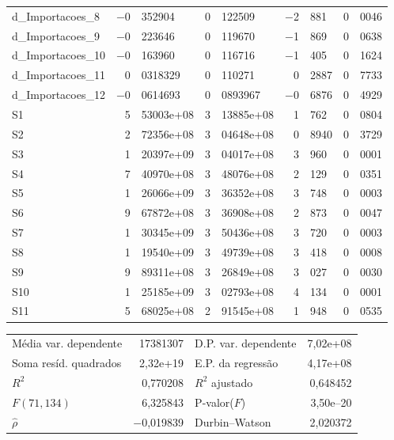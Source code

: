 \documentclass[11pt]{article}
\begin{document}
\begin{center}
\begin{tabular}{lr@{,}lr@{,}lr@{,}lr@{,}l}
d\_Importacoes\_8 &
  $-$0&352904 &
    0&122509 &
      $-$2&881 &
        0&0046 \\
d\_Importacoes\_9 &
  $-$0&223646 &
    0&119670 &
      $-$1&869 &
        0&0638 \\
d\_Importacoes\_10 &
  $-$0&163960 &
    0&116716 &
      $-$1&405 &
        0&1624 \\
d\_Importacoes\_11 &
  0&0318329 &
    0&110271 &
      0&2887 &
        0&7733 \\
d\_Importacoes\_12 &
  $-$0&0614693 &
    0&0893967 &
      $-$0&6876 &
        0&4929 \\
S1 &
  5&53003\textrm{e+08} &
    3&13885\textrm{e+08} &
      1&762 &
        0&0804 \\
S2 &
  2&72356\textrm{e+08} &
    3&04648\textrm{e+08} &
      0&8940 &
        0&3729 \\
S3 &
  1&20397\textrm{e+09} &
    3&04017\textrm{e+08} &
      3&960 &
        0&0001 \\
S4 &
  7&40970\textrm{e+08} &
    3&48076\textrm{e+08} &
      2&129 &
        0&0351 \\
S5 &
  1&26066\textrm{e+09} &
    3&36352\textrm{e+08} &
      3&748 &
        0&0003 \\
S6 &
  9&67872\textrm{e+08} &
    3&36908\textrm{e+08} &
      2&873 &
        0&0047 \\
S7 &
  1&30345\textrm{e+09} &
    3&50436\textrm{e+08} &
      3&720 &
        0&0003 \\
S8 &
  1&19540\textrm{e+09} &
    3&49739\textrm{e+08} &
      3&418 &
        0&0008 \\
S9 &
  9&89311\textrm{e+08} &
    3&26849\textrm{e+08} &
      3&027 &
        0&0030 \\
S10 &
  1&25185\textrm{e+09} &
    3&02793\textrm{e+08} &
      4&134 &
        0&0001 \\
S11 &
  5&68025\textrm{e+08} &
    2&91545\textrm{e+08} &
      1&948 &
        0&0535 \\
\end{tabular}

\vspace{1ex}
\begin{tabular}{lrlr}
Média var. dependente &  17381307 & D.P. var. dependente &  7,02\textrm{e+08} \\
Soma resíd. quadrados &  2,32\textrm{e+19} & E.P. da regressão &  4,17\textrm{e+08} \\
$R^2$ &  0,770208 & $R^2$ ajustado &  0,648452 \\
$F(71, 134)$ &  6,325843 & P-valor($F$) &  3,50\textrm{e--20} \\
$\hat{\rho}$ & $-$0,019839 & Durbin--Watson &  2,020372 \\
\end{tabular}


\end{center}
\end{document}
